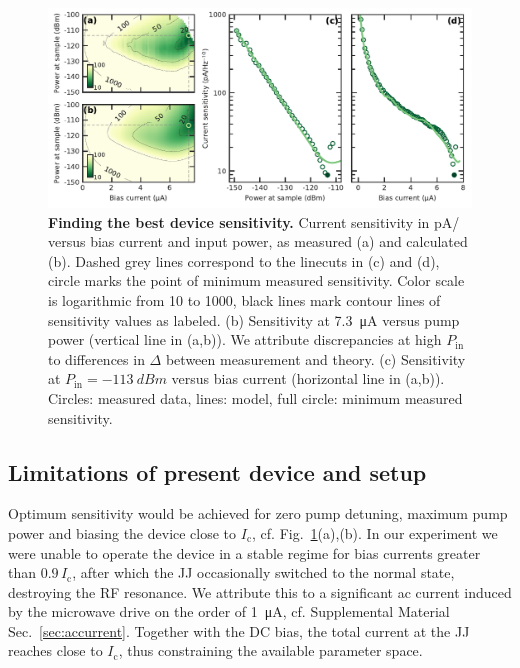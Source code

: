 \begin{figure}
	\centering
	\includegraphics[width=\linewidth]{chapter-currentdetection/figures/Figure4}
	\caption{
		\textbf{Finding the best device sensitivity.}
		Current sensitivity in \si{\pico\ampere/\sqrthz} versus bias current and input power, as measured (a) and calculated (b).
		Dashed grey lines correspond to the linecuts in (c) and (d), circle marks the point of minimum measured sensitivity.
		Color scale is logarithmic from 10 to 1000, black lines mark contour lines of sensitivity values as labeled.
		(b) Sensitivity at \SI{7.3}{\micro\ampere} versus pump power (vertical line in (a,b)).
		We attribute discrepancies at high $P_\text{in}$ to differences in $\Delta$ between measurement and theory.
		(c) Sensitivity at $P_\text{in}=\SI{-113}{dBm}$ versus bias current (horizontal line in (a,b)).
		Circles: measured data, lines: model, full circle: minimum measured sensitivity.
		\label{fig:figure4}
	}
\end{figure}

\subsection{Limitations of present device and setup}\label{subsec:limitations}
% 
Optimum sensitivity would be achieved for zero pump detuning, maximum pump power and biasing the device close to $I_\text{c}$, cf. Fig.~\ref{fig:figure4}(a),(b).
% 
In our experiment we were unable to operate the device in a stable regime for bias currents greater than $0.9 \,I_\text{c}$, after which the JJ occasionally switched to the normal state, destroying the RF resonance.
% 
We attribute this to a significant ac current induced by the microwave drive on the order of \SI{1}{\micro\ampere}, cf. Supplemental Material Sec.~\ref{sec:accurrent}.
%
Together with the DC bias, the total current at the JJ reaches close to $I_\text{c}$, thus constraining the available parameter space.

